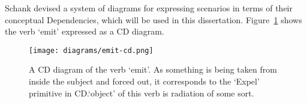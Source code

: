\documentclass{article}
\begin{document}
    Schank devised a system of diagrams for expressing scenarios in terms of their conceptual Dependencies, which will be used in this dissertation. Figure~\ref{fig:emit-cd} shows the verb `emit' expressed as a CD diagram.
    \begin{figure}
        \centerline{
            \texttt{[image: diagrams/emit-cd.png]}
        }
        \caption{A CD diagram of the verb `emit'. As something is being taken from inside the subject and forced out, it corresponds to the `Expel' primitive in CD.\@The `object' of this verb is radiation of some sort.}
        \label{fig:emit-cd}
    \end{figure}


    
    
\end{document}
